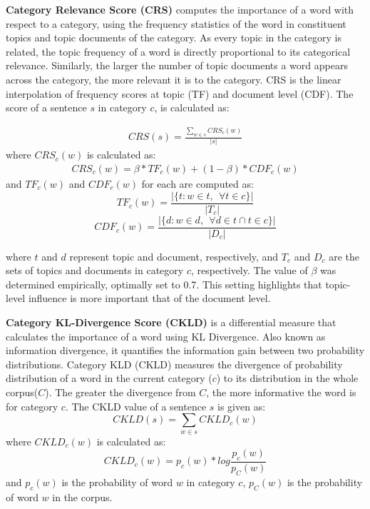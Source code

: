 \noindent\textbf{Category Relevance Score (CRS)} computes the importance of a word with respect to a category, using the frequency statistics of the word in constituent topics and topic documents of the category. As every topic in the category is related, the topic frequency of a word is directly proportional to its categorical relevance. Similarly, 
the larger the number of topic documents a word appears across the category, the more relevant it is to the category. CRS is the linear interpolation of frequency scores at topic (TF) and document level (CDF). The score of a sentence $s$ in category $c$, is calculated as:

\begin{eqnarray*}
CRS(s) = \frac{\sum_{w \in s} CRS_c(w)}{|s|}
\end{eqnarray*}
where $CRS_c(w)$ is calculated as:
\begin{eqnarray*}
CRS_c(w) = \beta * TF_c(w) + (1-\beta) * CDF_c(w)
\end{eqnarray*}
and $TF_c(w)$ and $CDF_c(w)$ for each are computed as:
\begin{displaymath}
    TF_c(w) = \frac{|\{ t:w \in t, ~~\forall t \in c \} |}{|T_c|}
\end{displaymath}
\begin{displaymath}
    CDF_c(w) = \frac{|\{ d:w \in d, ~~\forall d \in t \cap t \in c \} | }{|D_c|}
\end{displaymath}

where $t$ and $d$ represent topic and document, respectively, and $T_c$ and $D_c$ are the sets of topics and documents in category $c$, respectively. The value of $\beta$ was determined empirically, optimally set to 0.7.  This setting highlights that topic-level influence is more important that of the document level.

\noindent\textbf{Category KL-Divergence Score (CKLD)} is a differential measure that calculates the importance of a word using KL Divergence. Also known as information divergence, it quantifies the information gain between two probability distributions. Category KLD (CKLD) measures the divergence of probability distribution of a word in the current category ($c$) to its distribution in the whole corpus($C$). The greater the divergence from $C$, the more informative the word is for category $c$. The CKLD value of a sentence $s$ is given as:
\begin{displaymath}
CKLD(s) = \sum_{w \in s} CKLD_c(w)
\end{displaymath}
where $CKLD_c(w)$ is calculated as:
\begin{displaymath}
CKLD_c(w) = p_c(w)*log\frac{p_c(w)}{p_C(w)}
\end{displaymath}
and $p_c(w)$ is the probability of word $w$ in category $c$, $p_C(w)$ is the probability of word $w$ in the corpus.

